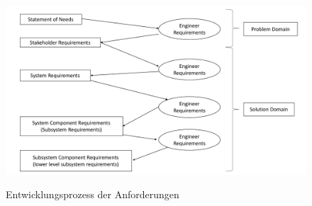 \begin{figure}[h!]
	\centering
	\includegraphics[scale=0.38]{img/levels-of-requirements-engineering.pdf}
	\caption{Entwicklungsprozess der Anforderungen}
	{\footnotesize \cite[Quelle: in Anlehnung an ][S.\,28]{hull_requirements_2011}}
	\label{abb:entwAnforderung}
\end{figure}

